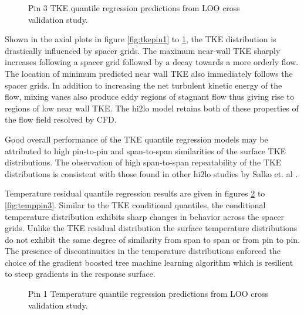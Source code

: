 \begin{figure}[H]%
    \centering
    \qquad
    \caption[Q-Q LOO TKE pin 3 results.]{Pin 3 TKE quantile regression predictions from LOO cross validation study.}%
    \label{fig:tkepin3}%
\end{figure}

Shown in the axial plots in figure \ref{fig:tkepin1} to \ref{fig:tkepin3}, the TKE distribution is drastically influenced by spacer grids.  The maximum near-wall TKE sharply increases following a spacer grid followed by a decay towards a more orderly flow.  The location of minimum predicted near wall TKE also immediately follows the spacer grids.  In addition to increasing the net turbulent kinetic energy of the flow, mixing vanes also produce eddy regions of stagnant flow thus giving rise to regions of low near wall TKE.  The hi2lo model retains both of these properties of the flow field resolved by CFD.    

Good overall performance of the TKE quantile regression models may be attributed to high pin-to-pin and span-to-span similarities of the surface TKE distributions. The observation of high span-to-span repeatability of the TKE distributions is consistent with those found in other hi2lo studies by Salko et. al \cite{salko17}.

Temperature residual quantile regression results are given in figures \ref{fig:temppin1} to \ref{fig:temppin3}.  Similar to the TKE conditional quantiles, the conditional temperature distribution exhibits sharp changes in behavior across the spacer grids. Unlike the TKE residual distribution the surface temperature distributions do not exhibit the same degree of similarity from span to span or from pin to pin.  The presence of discontinuities in the temperature distributions enforced the choice of the gradient boosted tree machine learning algorithm which is resilient to steep gradients in the response surface.

\begin{figure}[H]%
    \centering
    \qquad
    \caption[Q-Q LOO Temperature pin 1 results.]{Pin 1 Temperature quantile regression predictions from LOO cross validation study.}%
    \label{fig:temppin1}%
\end{figure}

